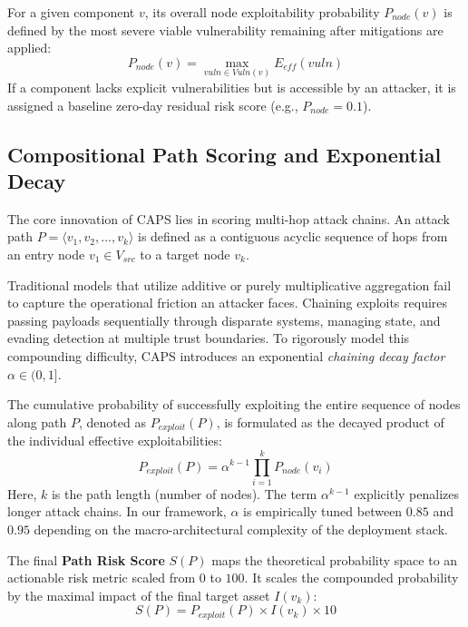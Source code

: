 For a given component $v$, its overall node exploitability probability $P_{node}(v)$ is defined by the most severe viable vulnerability remaining after mitigations are applied:
\begin{equation}
P_{node}(v) = \max_{vuln \in Vuln(v)} E_{eff}(vuln)
\end{equation}
If a component lacks explicit vulnerabilities but is accessible by an attacker, it is assigned a baseline zero-day residual risk score (e.g., $P_{node} = 0.1$).

\subsection{Compositional Path Scoring and Exponential Decay}
The core innovation of CAPS lies in scoring multi-hop attack chains. An attack path $P = \langle v_1, v_2, \dots, v_k \rangle$ is defined as a contiguous acyclic sequence of hops from an entry node $v_1 \in V_{src}$ to a target node $v_k$. 

Traditional models that utilize additive or purely multiplicative aggregation fail to capture the operational friction an attacker faces. Chaining exploits requires passing payloads sequentially through disparate systems, managing state, and evading detection at multiple trust boundaries. To rigorously model this compounding difficulty, CAPS introduces an exponential \textit{chaining decay factor} $\alpha \in (0, 1]$. 

The cumulative probability of successfully exploiting the entire sequence of nodes along path $P$, denoted as $P_{exploit}(P)$, is formulated as the decayed product of the individual effective exploitabilities:
\begin{equation}
P_{exploit}(P) = \alpha^{k-1} \prod_{i=1}^k P_{node}(v_i)
\end{equation}
Here, $k$ is the path length (number of nodes). The term $\alpha^{k-1}$ explicitly penalizes longer attack chains. In our framework, $\alpha$ is empirically tuned between $0.85$ and $0.95$ depending on the macro-architectural complexity of the deployment stack.

The final \textbf{Path Risk Score} $S(P)$ maps the theoretical probability space to an actionable risk metric scaled from $0$ to $100$. It scales the compounded probability by the maximal impact of the final target asset $I(v_k)$:
\begin{equation}
S(P) = P_{exploit}(P) \times I(v_k) \times 10
\end{equation}

